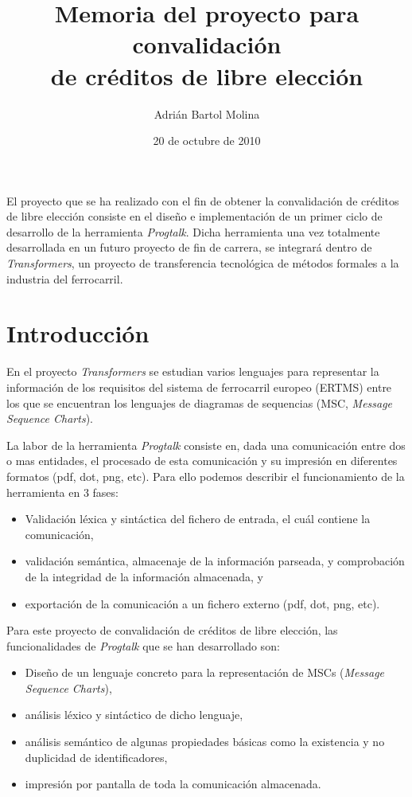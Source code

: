 \documentclass{article}
\title{Memoria del proyecto para convalidación\\ de créditos de libre elección}
\author{Adrián Bartol Molina}
\date{20 de octubre de 2010}
\begin{document}
\maketitle

El proyecto que se ha realizado con el fin de obtener la convalidación de créditos de libre elección consiste en el diseño e implementación de un primer ciclo de desarrollo de la herramienta \textit{Progtalk}. Dicha herramienta una vez totalmente desarrollada en un futuro proyecto de fin de carrera, se integrará dentro de \emph{Transformers}, un proyecto de transferencia tecnológica de métodos formales a la industria del ferrocarril.

\section{Introducción}

En el proyecto \emph{Transformers} se estudian varios lenguajes para representar la información de los requisitos del sistema de ferrocarril europeo (ERTMS) entre los que se encuentran los lenguajes de diagramas de sequencias (MSC, \emph{Message Sequence Charts}).

La labor de la herramienta \textit{Progtalk} consiste en, dada una comunicación entre dos o mas entidades, el procesado de esta comunicación y su impresión en diferentes formatos (pdf, dot, png, etc). Para ello podemos describir el funcionamiento de la herramienta en 3 fases:

\begin{itemize}
\item Validación léxica y sintáctica del fichero de entrada, el cuál contiene la comunicación,
\item validación semántica, almacenaje de la información parseada, y comprobación de la integridad de la información almacenada, y
\item exportación de la comunicación a un fichero externo (pdf, dot, png, etc).
\end{itemize}

Para este proyecto de convalidación de créditos de libre elección, las funcionalidades de \textit{Progtalk} que se han desarrollado son:

\begin{itemize}
\item Diseño de un lenguaje concreto para la representación de MSCs (\emph{Message Sequence Charts}),
\item análisis léxico y sintáctico de dicho lenguaje,
\item análisis semántico de algunas propiedades básicas como la existencia y no duplicidad de identificadores,
\item impresión por pantalla de toda la comunicación almacenada.
\end{itemize}
\end{document}
